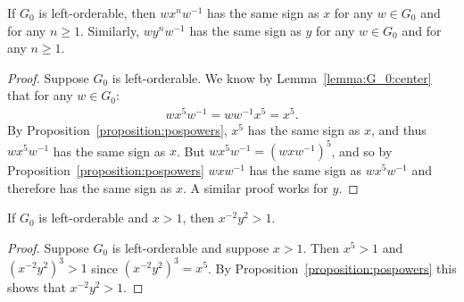\begin{lemma} If $G_0$ is left-orderable, then $wx^{n}w^{-1}$ has the same sign as $x$ for any $w\in{}G_0$ and for any $n\geq{}1$. Similarly, $wy^{n}w^{-1}$ has the same sign as $y$ for any $w\in{}G_0$ and for any $n\geq{}1$.
\label{lemma:G_0:conjugates}
\end{lemma}
\begin{proof} Suppose $G_0$ is left-orderable. We know by Lemma~\ref{lemma:G_0:center} that for any $w\in{}G_0$:
\begin{align*}
wx^{5}w^{-1}=ww^{-1}x^{5}=x^{5}.
\end{align*}
By Proposition~\ref{proposition:pospowers}, $x^5$ has the same sign as $x$, and thus $wx^{5}w^{-1}$ has the same sign as $x$. But $wx^{5}w^{-1}=(wxw^{-1})^{5}$, and so by Proposition~\ref{proposition:pospowers} $wxw^{-1}$ has the same sign as $wx^{5}w^{-1}$ and therefore has the same sign as $x$. A similar proof works for $y$.
\end{proof}

\begin{lemma} If $G_0$ is left-orderable and $x>1$, then $x^{-2}y^{2}>1$.
\label{lemma:G_0:XXyy}
\end{lemma}
\begin{proof}
Suppose $G_0$ is left-orderable and suppose $x>1$. Then $x^5>1$ and $(x^{-2}y^2)^{3}>1$ since $(x^{-2}y^2)^{3}=x^5$. By Proposition~\ref{proposition:pospowers} this shows that $x^{-2}y^2>1$.
\end{proof}

